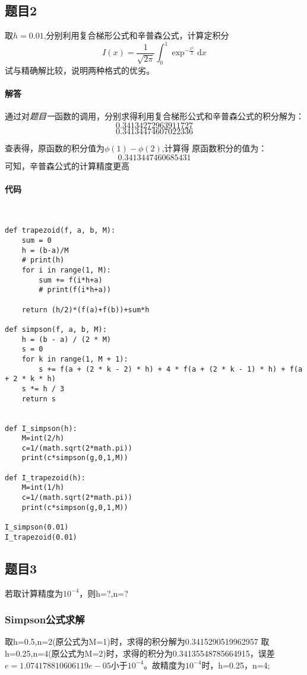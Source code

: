 \subsection{题目2}

取$h=0.01$,分别利用复合梯形公式和辛普森公式，计算定积分
$$I(x)=\frac{1}{\sqrt{2 \pi}} \int_{0}^{1} \exp ^{-\frac{x^{2}}{2}} \mathrm{d} x$$
试与精确解比较，说明两种格式的优劣。

\paragraph{解答}
通过对\textit{题目一}函数的调用，分别求得利用复合梯形公式和辛普森公式的积分解为：
\[
0.34134272963911727\]
\[
0.34134474607022336
\]

查表得，原函数的积分值为$\phi(1)-\phi(2)$,计算得
原函数积分的值为：
\[
	0.3413447460685431
\]
可知，辛普森公式的计算精度更高


\paragraph{代码}


\begin{verbatim}


def trapezoid(f, a, b, M):
    sum = 0
    h = (b-a)/M
    # print(h)
    for i in range(1, M):
        sum += f(i*h+a)
        # print(f(i*h+a))

    return (h/2)*(f(a)+f(b))+sum*h

def simpson(f, a, b, M):
    h = (b - a) / (2 * M)
    s = 0
    for k in range(1, M + 1):
        s += f(a + (2 * k - 2) * h) + 4 * f(a + (2 * k - 1) * h) + f(a + 2 * k * h)
    s *= h / 3
    return s


def I_simpson(h):
    M=int(2/h)
    c=1/(math.sqrt(2*math.pi))
    print(c*simpson(g,0,1,M))
    
def I_trapezoid(h):
    M=int(1/h)
    c=1/(math.sqrt(2*math.pi))
    print(c*simpson(g,0,1,M))
    
I_simpson(0.01)
I_trapezoid(0.01)
\end{verbatim}






\subsection{题目3}
若取计算精度为$10^{-4}$，则h=?,n=?

\subsubsection{Simpson公式求解}
取h=0.5,n=2(原公式为M=1)时，求得的积分解为0.3415290519962957
取h=0.25,n=4(原公式为M=2)时，求得的积分为0.34135548785664915，误差$e=1.074178810606119e-05$小于$10^{-4}$。故精度为$10^{-4}$时，h=0.25，n=4;



